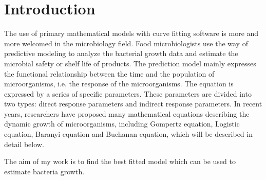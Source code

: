 \documentclass[11pt]{article}
\begin{document}
\section{Introduction}
The use of primary mathematical models with curve fitting software is more and more welcomed in the microbiology field. Food microbiologists use the way of predictive modeling to analyze the bacterial growth data and estimate the microbial safety or shelf life of products\citep{zwietering1990modeling}.
The prediction model mainly expresses the functional relationship between the time and the population of microorganisms, i.e. the response of the microorganisms. The equation is expressed by a series of specific parameters. These parameters are divided into two types: direct response parameters and indirect response parameters. In recent years, researchers have proposed many mathematical equations describing the dynamic growth of microorganisms, including Gompertz equation, Logistic equation, Baranyi equation and Buchanan equation, which will be described in detail below.

The aim of my work is to find the best fitted model which can be used to estimate bacteria growth.
\end{document}
